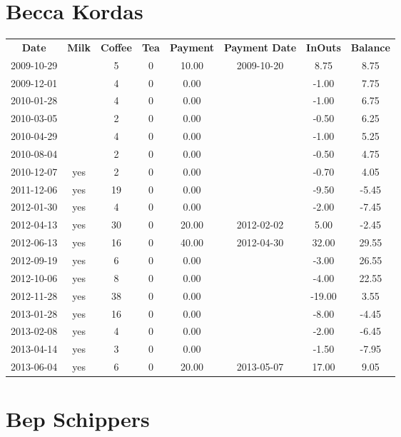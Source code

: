 \section{Becca Kordas}

\begin{center}
\begin{tabular}{cccccccc}
\textbf{Date} & \textbf{Milk} & \textbf{Coffee} & \textbf{Tea} & \textbf{Payment} & \textbf{Payment Date} & \textbf{InOuts} & \textbf{Balance} \\
2009-10-29 &  &  5 & 0 & 10.00 & 2009-10-20 &   8.75 &  8.75\\ 
2009-12-01 &  &  4 & 0 &  0.00 &  &  -1.00 &  7.75\\ 
2010-01-28 &  &  4 & 0 &  0.00 &  &  -1.00 &  6.75\\ 
2010-03-05 &  &  2 & 0 &  0.00 &  &  -0.50 &  6.25\\ 
2010-04-29 &  &  4 & 0 &  0.00 &  &  -1.00 &  5.25\\ 
2010-08-04 &  &  2 & 0 &  0.00 &  &  -0.50 &  4.75\\ 
2010-12-07 & yes &  2 & 0 &  0.00 &  &  -0.70 &  4.05\\ 
2011-12-06 & yes & 19 & 0 &  0.00 &  &  -9.50 & -5.45\\ 
2012-01-30 & yes &  4 & 0 &  0.00 &  &  -2.00 & -7.45\\ 
2012-04-13 & yes & 30 & 0 & 20.00 & 2012-02-02 &   5.00 & -2.45\\ 
2012-06-13 & yes & 16 & 0 & 40.00 & 2012-04-30 &  32.00 & 29.55\\ 
2012-09-19 & yes &  6 & 0 &  0.00 &  &  -3.00 & 26.55\\ 
2012-10-06 & yes &  8 & 0 &  0.00 &  &  -4.00 & 22.55\\ 
2012-11-28 & yes & 38 & 0 &  0.00 &  & -19.00 &  3.55\\ 
2013-01-28 & yes & 16 & 0 &  0.00 &  &  -8.00 & -4.45\\ 
2013-02-08 & yes &  4 & 0 &  0.00 &  &  -2.00 & -6.45\\ 
2013-04-14 & yes &  3 & 0 &  0.00 &  &  -1.50 & -7.95\\ 
2013-06-04 & yes &  6 & 0 & 20.00 & 2013-05-07 &  17.00 &  9.05
\end{tabular}
\end{center}

\section{Bep Schippers}

